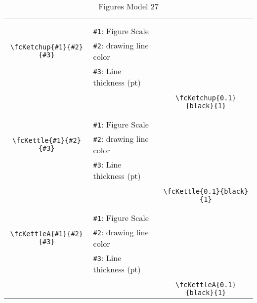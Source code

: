 \documentclass[x11names]{article}
\begin{document}
\begin{table}[H]
\begin{tabular}{|c|l|c|}
	&&\multirow{5}{*}{\fcKetchup{0.1}{black}{1}}\\	&&\\	&\verb|#1|: Figure Scale &\\	\verb|\fcKetchup{#1}{#2}{#3}|&	\verb|#2|: drawing line color &\\	&\verb|#3|: Line thickness (pt) &\\ &&\\&&	\verb|\fcKetchup{0.1}{black}{1}|\\\hline 	
	&&\multirow{5}{*}{\fcKettle{0.1}{black}{1}}\\	&&\\	&\verb|#1|: Figure Scale &\\	\verb|\fcKettle{#1}{#2}{#3}|&	\verb|#2|: drawing line color &\\	&\verb|#3|: Line thickness (pt) &\\ &&\\&&	\verb|\fcKettle{0.1}{black}{1}|\\\hline 	
	&&\multirow{5}{*}{\fcKettleA{0.1}{black}{1}}\\	&&\\	&\verb|#1|: Figure Scale &\\	\verb|\fcKettleA{#1}{#2}{#3}|&	\verb|#2|: drawing line color &\\	&\verb|#3|: Line thickness (pt) &\\ &&\\&&	\verb|\fcKettleA{0.1}{black}{1}|\\\hline 	\hline\end{tabular}\caption{Figures Model 27}\label{tab27}\end{table}
\end{document}
